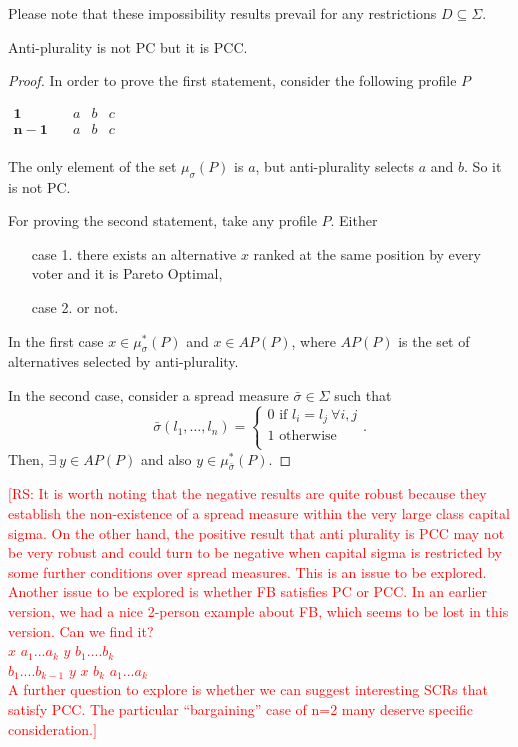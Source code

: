 \documentclass[version=3.21, pagesize, notitlepage, twoside=off, bibliography=totoc, DIV=calc, fontsize=12pt, a4paper]{scrartcl}
\newcommand{\commentRS}[1]{\textcolor{red}{\small$\big[$RS: #1$\big]$}}
\newcommand{\musigma}{\mu_{\sigma}}
\newcommand{\mustar}{\mu_{\sigma}^*}
\begin{document}
Please note that these impossibility results prevail for any restrictions $D \subseteq \Sigma$.

\begin{proposition}
	Anti-plurality is not PC but it is PCC.
\end{proposition}
\begin{proof}
	In order to prove the first statement, consider the following profile $P$
	\begin{center}
		$
		\begin{array}{cccc}
		\mathbf{1} \quad &a&b&c\\
		\mathbf{n-1} \quad &a&b&c\\
		\end{array}
		$
	\end{center}
	The only element of the set $\musigma(P)$ is $a$, but anti-plurality selects $a$ and $b$. So it is not PC.
	
	For proving the second statement, take any profile $P$. Either
	\begin{itemize}
		\item[case 1.] there exists an alternative $x$ ranked at the same position by every voter and it is Pareto Optimal,
		\item[case 2.] or not.
	\end{itemize}
	In the first case $x\in \mustar(P) $ and $ x \in AP(P)$, where $AP(P)$ is the set of alternatives selected by anti-plurality.
	
	In the second case, consider a spread measure $\bar{\sigma} \in \Sigma$ such that \[
	\bar{\sigma}(l_1, \dots,l_n)= \begin{cases}
	0 \text{ if } l_i=l_j \ \forall i,j \\ 1 \text{ otherwise} \\
	\end{cases}. \]
	Then, $\exists \ y \in AP(P)$ and also $ y \in \mu_{\bar{\sigma}}^*(P)$.
\end{proof}

\commentRS{ It is worth noting that the negative results are quite robust because they establish the non-existence of a spread measure within the very large class capital sigma. On the other hand, the positive result that anti plurality is PCC may not be very robust and could turn to be negative when capital sigma is restricted by some further conditions over spread measures. This is an issue to be explored. \\ Another issue to be explored is whether FB satisfies PC or PCC. In an earlier version, we had a nice 2-person example about FB, which seems to be lost in this version. Can we find it?	\bigskip \\ {\color{black}$x$ $a_{1}...a_{k}$ $y$ $b_{1}....b_{k}$ \\	$b_{1}....b_{k-1}$ $y$ $x$ $b_{k}$ $a_{1}...a_{k}$} \bigskip \\
A further question to explore is whether we can suggest interesting SCRs that satisfy PCC. The particular “bargaining” case of n=2 many deserve specific consideration.}
\pagebreak
\end{document}
